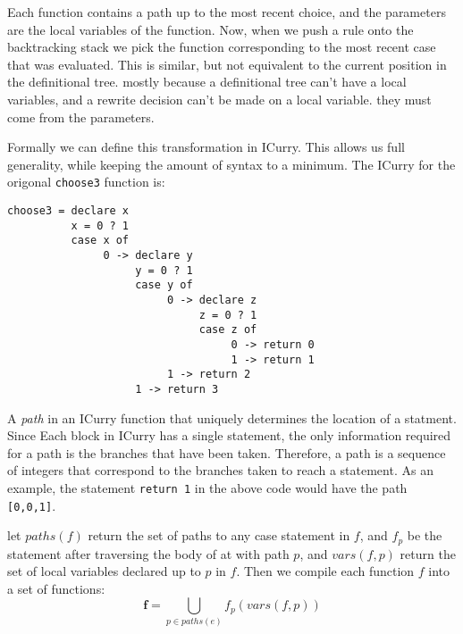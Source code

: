 Each function contains a path up to the most recent choice,
and the parameters are the local variables of the function.
Now, when we push a rule onto the backtracking stack we pick the function corresponding to the most recent
case that was evaluated.  This is similar, but not equivalent to the current position in the definitional tree.
mostly because a definitional tree can't have a local variables, and a rewrite decision can't be made on
a local variable.  they must come from the parameters.

Formally we can define this transformation in ICurry.
This allows us full generality, while keeping the amount of syntax to a minimum.
The ICurry for the origonal \texttt{choose3} function is:
\begin{verbatim}
choose3 = declare x
          x = 0 ? 1
          case x of 
               0 -> declare y
                    y = 0 ? 1
                    case y of
                         0 -> declare z
                              z = 0 ? 1
                              case z of
                                   0 -> return 0
                                   1 -> return 1
                         1 -> return 2
                    1 -> return 3
\end{verbatim}

A \textit{path} in an ICurry function that uniquely determines the location of a statment.
Since Each block in ICurry has a single statement, the only information required for a path
is the branches that have been taken.
Therefore, a path is a sequence of integers that correspond to the branches taken to reach a statement.
As an example, the statement \texttt{return 1} in the above code would have the path \texttt{[0,0,1]}.

let $paths(f)$ return the set of paths to any case statement in $f$,
and $f_p$ be the statement after traversing the body of at with path $p$,
and $vars(f,p)$ return the set of local variables declared up to $p$ in $f$.
Then we compile each function $f$ into a set of functions:
$$\textbf{f} = \bigcup_{p \in paths(e)} f_p(vars(f,p))$$\\

